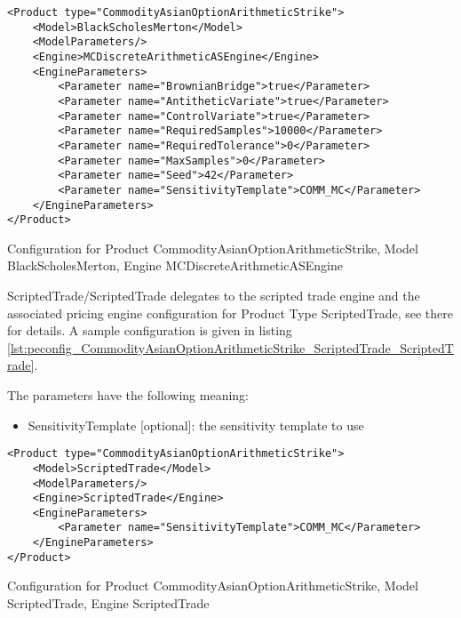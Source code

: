 \begin{longlisting}
\begin{verbatim}
<Product type="CommodityAsianOptionArithmeticStrike">
    <Model>BlackScholesMerton</Model>
    <ModelParameters/>
    <Engine>MCDiscreteArithmeticASEngine</Engine>
    <EngineParameters>
        <Parameter name="BrownianBridge">true</Parameter>    
        <Parameter name="AntitheticVariate">true</Parameter>    
        <Parameter name="ControlVariate">true</Parameter>    
        <Parameter name="RequiredSamples">10000</Parameter>    
        <Parameter name="RequiredTolerance">0</Parameter>    
        <Parameter name="MaxSamples">0</Parameter>    
        <Parameter name="Seed">42</Parameter>    
        <Parameter name="SensitivityTemplate">COMM_MC</Parameter>
    </EngineParameters>
</Product>
\end{verbatim}
\caption{Configuration for Product CommodityAsianOptionArithmeticStrike, Model BlackScholesMerton, Engine MCDiscreteArithmeticASEngine}
\label{lst:peconfig_CommodityAsianOptionArithmeticStrike_BlackScholesMerton_MCDiscreteArithmeticASEngine}
\end{longlisting}

ScriptedTrade/ScriptedTrade delegates to the scripted trade engine and the associated pricing engine configuration for
Product Type ScriptedTrade, see there for details. A sample configuration is given in listing
\ref{lst:peconfig_CommodityAsianOptionArithmeticStrike_ScriptedTrade_ScriptedTrade}.

The parameters have the following meaning:

\begin{itemize}
\item SensitivityTemplate [optional]: the sensitivity template to use 
\end{itemize}

\begin{longlisting}
\begin{verbatim}
<Product type="CommodityAsianOptionArithmeticStrike">
    <Model>ScriptedTrade</Model>
    <ModelParameters/>
    <Engine>ScriptedTrade</Engine>
    <EngineParameters>
        <Parameter name="SensitivityTemplate">COMM_MC</Parameter>
    </EngineParameters>
</Product>
\end{verbatim}
\caption{Configuration for Product CommodityAsianOptionArithmeticStrike, Model ScriptedTrade, Engine ScriptedTrade}
\label{lst:peconfig_CommodityAsianOptionArithmeticStrike_ScriptedTrade_ScriptedTrade}
\end{longlisting}

